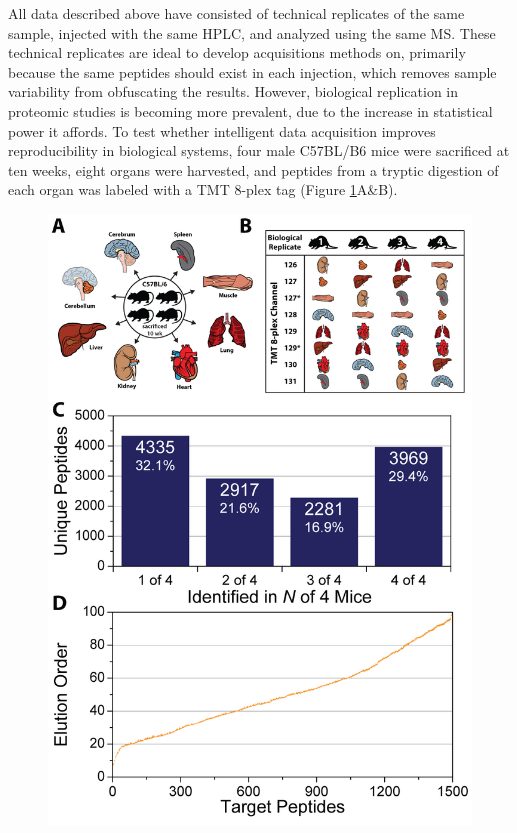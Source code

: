 All data described above have consisted of technical replicates of the same sample, injected with the same HPLC, and analyzed using the same MS. These technical replicates are ideal to develop acquisitions methods on, primarily because the same peptides should exist in each injection, which removes sample variability from obfuscating the results. However, biological replication in proteomic studies is becoming more prevalent, due to the increase in statistical power it affords. To test whether intelligent data acquisition improves reproducibility in biological systems, four male C57BL/B6 mice were sacrificed at ten weeks, eight organs were harvested, and peptides from a tryptic digestion of each organ was labeled with a TMT 8-plex tag (Figure \ref{fig:eoa6}A\&B).
\begin{figure}[p]
	\centering
	\includegraphics[width=0.75\columnwidth]{eoa/EOA 6.png}
	\label{fig:eoa6}
\end{figure}
